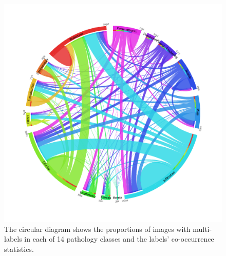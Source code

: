 \documentclass[10pt,twocolumn,letterpaper]{article}
\begin{document}
\begin{figure}[t]
	\centering
	\includegraphics[width=0.8\linewidth]{circos-table-14.png}
	\caption{The circular diagram shows the proportions of images with multi-labels in each of 14 pathology classes and the labels' co-occurrence statistics.}
	\label{fig:s14}
\end{figure}
\end{document}
